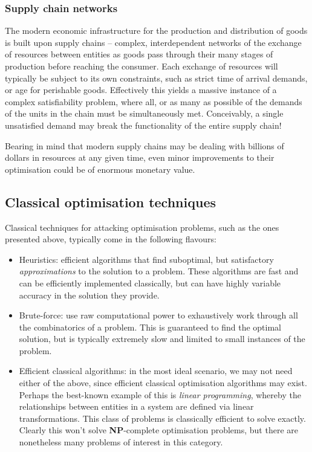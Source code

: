 \subsubsection{Supply chain networks}

The modern economic infrastructure for the production and distribution of goods is built upon supply chains -- complex, interdependent networks of the exchange of resources between entities as goods pass through their many stages of production before reaching the consumer. Each exchange of resources will typically be subject to its own constraints, such as strict time of arrival demands, or age for perishable goods. Effectively this yields a massive instance of a complex satisfiability problem, where all, or as many as possible of the demands of the units in the chain must be simultaneously met. Conceivably, a single unsatisfied demand may break the functionality of the entire supply chain! 

Bearing in mind that modern supply chains may be dealing with billions of dollars in resources at any given time, even minor improvements to their optimisation could be of enormous monetary value.

\subsection{Classical optimisation techniques}

Classical techniques for attacking optimisation problems, such as the ones presented above, typically come in the following flavours:
\begin{itemize}
	\item Heuristics: efficient algorithms that find suboptimal, but satisfactory \textit{approximations} to the solution to a problem. These algorithms are fast and can be efficiently implemented classically, but can have highly variable accuracy in the solution they provide.
	\item Brute-force: use raw computational power to exhaustively work through all the combinatorics of a problem. This is guaranteed to find the optimal solution, but is typically extremely slow and limited to small instances of the problem.
	\item Efficient classical algorithms: in the most ideal scenario, we may not need either of the above, since efficient classical optimisation algorithms may exist. Perhaps the best-known example of this is \textit{linear programming}, whereby the relationships between entities in a system are defined via linear transformations. This class of problems is classically efficient to solve exactly. Clearly this won't solve \textbf{NP}-complete optimisation problems, but there are nonetheless many problems of interest in this category.
\end{itemize}

